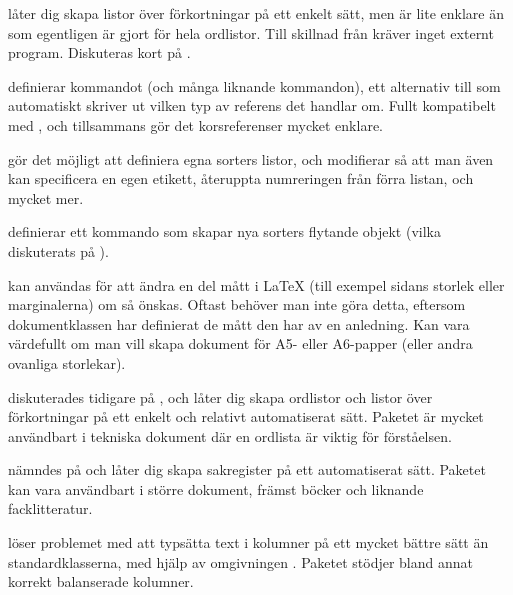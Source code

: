 \documentclass[lang=sv,ptsize=10pt,font=none,nomath,titles=bf,../../a4.tex]{subfiles}
\begin{document}
\begin{description}
	\item[\pack{acro}]
	låter dig skapa listor över förkortningar på ett enkelt sätt, men är
	lite enklare än  som egentligen är gjort för hela
	ordlistor. Till skillnad från  kräver 
	inget externt program. Diskuteras kort på .

	\item[\pack{cleveref}]
	definierar kommandot  (och många liknande kommandon), ett
	alternativ till  som automatiskt skriver ut vilken typ av
	referens det handlar om. Fullt kompatibelt med , och
	tillsammans gör det korsreferenser mycket enklare.

	\item[\pack{enumitem}]
	gör det möjligt att definiera egna sorters listor, och modifierar 
		så att man även kan specificera en egen etikett, återuppta
	numreringen från förra listan, och mycket mer.
	
	\item[\pack{float}]
	definierar ett kommando  som skapar nya sorters flytande
	objekt (vilka diskuterats på ).
	
	\item[\pack{geometry}]
	kan användas för att ändra en del mått i \LaTeX{} (till exempel sidans
	storlek eller marginalerna) om så önskas. Oftast behöver man inte göra
	detta, eftersom dokumentklassen har definierat de mått den har av en
	anledning. Kan vara värdefullt om man vill skapa dokument för A5-%
	eller A6-papper (eller andra ovanliga storlekar).

	\item[\pack{glossaries}]
	diskuterades tidigare på , och låter
	dig skapa ordlistor och listor över förkortningar på ett enkelt
	och relativt automatiserat sätt. Paketet är mycket användbart i
	tekniska dokument där en ordlista är viktig för förståelsen.

	\item[\pack{imakeidx}]
	nämndes på  och låter dig skapa sakregister
	på ett automatiserat sätt. Paketet kan vara användbart i större
	dokument, främst böcker och liknande facklitteratur.

 	\item[\pack{multicol}]
 	löser problemet med att typsätta text i kolumner på ett mycket bättre
 	sätt än standardklasserna, med hjälp av omgivningen .
 	Paketet stödjer bland annat korrekt balanserade kolumner.
 	

\end{description}
\end{document}
